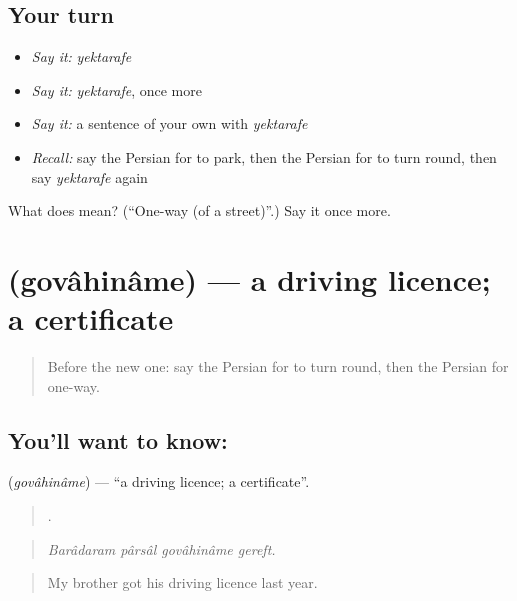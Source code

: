 \subsection*{Your turn}
\begin{itemize}
\raggedright
  \item \emph{Say it:} \emph{yektarafe}
  \item \emph{Say it:} \emph{yektarafe}, once more
  \item \emph{Say it:} a sentence of your own with \emph{yektarafe}
  \item \emph{Recall:} say the Persian for to park, then the Persian for to turn round, then say \emph{yektarafe} again
\end{itemize}

\begin{tcolorbox}[breakable,colback=teal!4,colframe=teal!35!black,title={Before you move on}]
What does   mean? (\textquotedblleft{}One-way (of a street)\textquotedblright{}.) Say it once more.
\end{tcolorbox}
\section[\texorpdfstring{\fa{گواهینامه} (govâhinâme)}{گواهینامه (govâhinâme)}]{ (govâhinâme) — a driving licence; a certificate}

\label{lesson:FA-C426-govahiname}



\begin{quote}
Before the new one: say the Persian for to turn round, then the Persian for one-way.
\end{quote}

\subsection*{You'll want to know: }
\textbf{} (\emph{govâhinâme}) — \textquotedblleft{}a driving licence; a certificate\textquotedblright{}.

\begin{quote}
   .
\end{quote}

\begin{quote}
\emph{Barâdaram pârsâl govâhinâme gereft.}
\end{quote}

\begin{quote}
My brother got his driving licence last year.
\end{quote}


